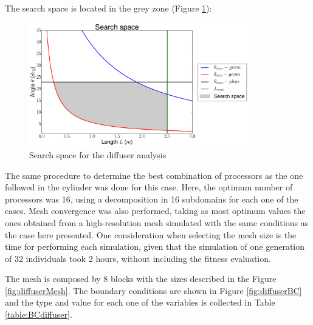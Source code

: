 The search space is located in the grey zone (Figure \ref{fig:searchSpace}):

     \begin{figure}[h!]
        \centering
        \includegraphics[width=0.85\textwidth]{Figures/3/SearchSpace.pdf}
        \caption{Search space for the diffuser analysis}
        \label{fig:searchSpace}
    \end{figure}

\newpage

The same procedure to determine the best combination of processors as the one followed in the cylinder was done for this case. Here, the optimum number of processors was 16, using a decomposition in 16 subdomains for each one of the cases. Mesh convergence was also performed, taking as most optimum values the ones obtained from a high-resolution mesh simulated with the same conditions as the case here presented. One consideration when selecting the mesh size is the time for performing each simulation, given that the simulation of one generation of 32 individuals took 2 hours, without including the fitness evaluation. 

The mesh is composed by 8 blocks with the sizes described in the Figure \ref{fig:diffuserMesh}. The boundary conditions are shown in Figure \ref{fig:diffuserBC} and the type and value for each one of the variables is collected in Table \ref{table:BCdiffuser}. 

    \vspace{10mm}    
    
